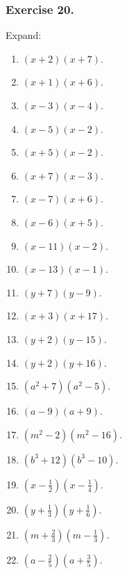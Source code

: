\documentclass{book}
\begin{document}
\subsubsection*{Exercise 20.}

Expand:
\begin{enumerate}
\item $(x + 2)(x + 7)$.

\item $(x + 1)(x + 6)$.

\item $(x - 3)(x - 4)$.

\item $(x - 5)(x - 2)$.

\item $(x + 5)(x - 2)$.

\item $(x + 7)(x - 3)$.

\item $(x - 7)(x + 6)$.

\item $(x - 6)(x + 5)$.

\item $(x - 11)(x - 2)$.

\item $(x - 13)(x - 1)$.

\item $(y + 7)(y - 9)$.

\item $(x + 3)(x + 17)$.

\item $(y+2)(y-15)$.

\item $(y+2)(y+16)$.

\item $(a^2 + 7)(a^2 - 5)$.

\item$(a-9)(a+9)$.

\item $(m^2 - 2)(m^2 - 16)$.

\item $(b^3 + 12)(b^3 - 10)$.

\item $(x - \frac{1}{2})(x - \frac{1}{4})$.

\item$(y + \frac{1}{3})(y + \frac{1}{6})$.

\item $(m + \frac{2}{3})(m - \frac{1}{3})$.

\item $(a - \frac{2}{5})(a + \frac{3}{5})$.


\end{enumerate}
\end{document}
